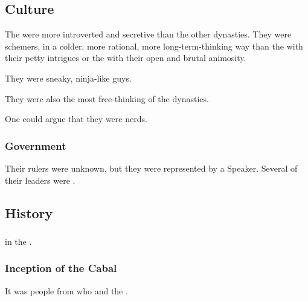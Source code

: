 \subsection{Culture}
The \TiphredSerah{} were more introverted and secretive than the other dynasties. 
They were schemers, in a colder, more rational, more long-term-thinking way than the \CiriathSepher{} with their petty intrigues or the \Mystraacht{} with their open and brutal animosity. 

They were sneaky, ninja-like guys. 

They were also the most free-thinking of the dynasties. 

One could argue that they were nerds. 





\subsubsection{Government}
Their rulers were unknown, but they were represented by a Speaker. 
Several of their leaders were \resviel. 









\subsection{History}





\subsubsection{\ResphanWars}
\TiphredSerah {} in the \resphanwars. 





\subsubsection{Inception of the Cabal}
It was people from \TiphredSerah{} who  and  the . 









